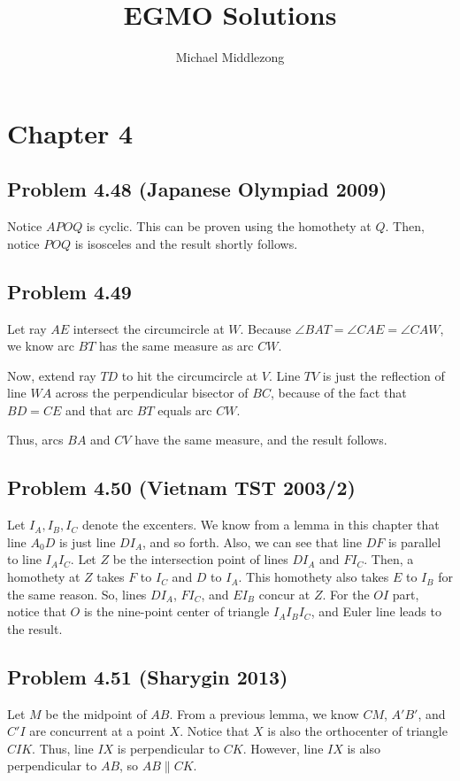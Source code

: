 \documentclass{scrartcl}
\title{EGMO Solutions}
\author{Michael Middlezong}
\begin{document}
\maketitle

\section*{Chapter 4}
\subsection*{Problem 4.48 (Japanese Olympiad 2009)}
Notice $APOQ$ is cyclic. This can be proven using the homothety at $Q$. Then, notice $POQ$ is isosceles and the result shortly follows.
\subsection*{Problem 4.49}
Let ray $AE$ intersect the circumcircle at $W$. Because $\angle BAT = \angle CAE = \angle CAW$, we know arc $BT$ has the same measure as arc $CW$.

Now, extend ray $TD$ to hit the circumcircle at $V$. Line $TV$ is just the reflection of line $WA$ across the perpendicular bisector of $BC$, because of the fact that $BD = CE$ and that arc $BT$ equals arc $CW$.

Thus, arcs $BA$ and $CV$ have the same measure, and the result follows.
\subsection*{Problem 4.50 (Vietnam TST 2003/2)}
Let $I_A, I_B, I_C$ denote the excenters.
We know from a lemma in this chapter that line $A_0D$ is just line $DI_A$, and so forth. Also, we can see that line $DF$ is parallel to line $I_AI_C$. Let $Z$ be the intersection point of lines $DI_A$ and $FI_C$. Then, a homothety at $Z$ takes $F$ to $I_C$ and $D$ to $I_A$. This homothety also takes $E$ to $I_B$ for the same reason. So, lines $DI_A$, $FI_C$, and $EI_B$ concur at $Z$. For the $OI$ part, notice that $O$ is the nine-point center of triangle $I_AI_BI_C$, and Euler line leads to the result.
\subsection*{Problem 4.51 (Sharygin 2013)}
Let $M$ be the midpoint of $AB$. From a previous lemma, we know $CM$, $A'B'$, and $C'I$ are concurrent at a point $X$. Notice that $X$ is also the orthocenter of triangle $CIK$. Thus, line $IX$ is perpendicular to $CK$. However, line $IX$ is also perpendicular to $AB$, so $AB \parallel CK$.
\end{document}
